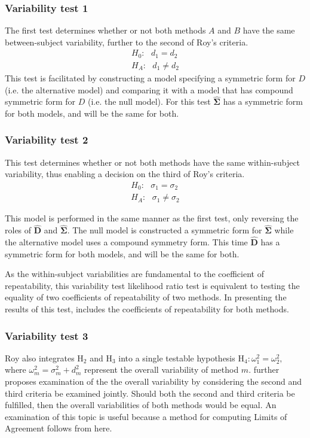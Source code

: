 \documentclass[12pt, a4paper]{report}
\theoremstyle{plain}
\theoremstyle{definition}
\theoremstyle{remark}
\begin{document}
			\subsubsection{Variability test 1}
			The first test determines whether or not both methods $A$ and $B$ have the same between-subject variability, further to the second of Roy's criteria.
			\begin{eqnarray*}
				H_{0}: \mbox{ }d_{1}  = d_{2} \\
				H_{A}: \mbox{ }d_{1}  \neq d_{2}
			\end{eqnarray*}
			This test is facilitated by constructing a model specifying a symmetric form for $D$ (i.e. the alternative model) and comparing it with a model that has compound symmetric form for $D$ (i.e. the null model). For this test $\boldsymbol{\hat{\Sigma}}$ has a symmetric form for both models, and will be the same for both.
			
			\subsubsection{Variability test 2}
			
			This test determines whether or not both methods have the same within-subject variability, thus enabling a decision on the third of Roy's criteria.
			\begin{eqnarray*}
				H_{0}: \mbox{ }\sigma_{1}  = \sigma_{2} \\
				H_{A}: \mbox{ }\sigma_{1}  \neq \sigma_{2}
			\end{eqnarray*}
			
			This model is performed in the same manner as the first test, only reversing the roles of $\boldsymbol{\hat{D}}$ and $\boldsymbol{\hat{\Sigma}}$. The null model is constructed a symmetric form for $\boldsymbol{\hat{\Sigma}}$ while the alternative model uses a compound symmetry form. This time $\boldsymbol{\hat{D}}$ has a symmetric form for both models, and will be the same for both.
			
			As the within-subject variabilities are fundamental to the coefficient of repeatability, this variability test likelihood ratio test is equivalent to testing the equality of two coefficients of repeatability of two methods. In presenting the results of this test, \citet{ARoy2009} includes the coefficients of repeatability for both methods.
			
			
			\subsubsection{Variability test 3}
			Roy also integrates $\mathrm{H}_2$ and $\mathrm{H}_3$ into a single testable hypothesis $\mathrm{H}_4\colon \omega^2_1=\omega^2_2,$ where $\omega^2_m = \sigma^2_m + d^2_m$ represent the overall variability of method $m.$ 		\citet{ARoy2009} further proposes examination of the the overall variability by considering the second and third criteria be examined jointly. Should both the second and third criteria be fulfilled, then the overall variabilities of both methods would be equal. An examination of this topic is useful because a method for computing Limits of Agreement follows from here.
			
\end{document}
